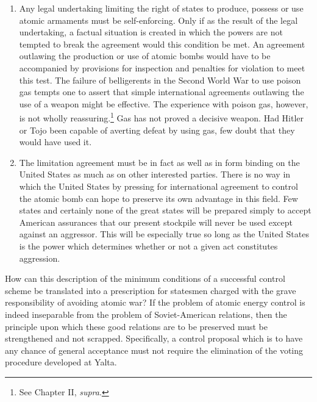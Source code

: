 \begin{enumerate}[1.]
\item Any legal undertaking limiting the right of states to produce, possess or use atomic armaments must be self-enforcing. Only if as the result of the legal undertaking, a factual situation is created in which the powers are not tempted to break the agreement would this condition be met. An agreement outlawing the production or use of atomic bombs would have to be accompanied by provisions for inspection and penalties for violation to meet this test. The failure of belligerents in the Second World War to use poison gas tempts one to assert that simple international agreements outlawing the use of a weapon might be effective. The experience with poison gas, however, is not wholly reassuring.\footnote{See Chapter II, \textit{supra}.} Gas has not proved a decisive weapon. Had Hitler or Tojo been capable of averting defeat by using gas, few doubt that they would have used it.

\item The limitation agreement must be in fact as well as in form binding on the United States as much as on other interested parties. There is no way in which the United States by pressing for international agreement to control the atomic bomb can hope to preserve its own advantage in this field. Few states and certainly none of the great states will be prepared simply to accept American assurances that our present stockpile will never be used except against an aggressor. This will be especially true so long as the United States is the power which determines whether or not a given act constitutes aggression.

\end{enumerate}

How can this description of the minimum conditions of a successful control scheme be translated into a prescription for statesmen charged with the grave responsibility of avoiding atomic war? If the problem of atomic energy control is indeed inseparable from the problem of Soviet-American relations, then the principle upon which these good relations are to be preserved must be strengthened and not scrapped. Specifically, a control proposal which is to have any chance of general acceptance must not require the elimination of the voting procedure developed at Yalta.

\label{V-UNSC}

